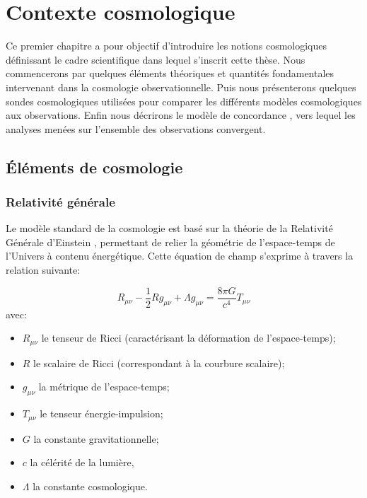 \documentclass[../main/main.tex]{subfiles}
\begin{document}
\chapter{Contexte cosmologique}\label{cp:cosmo}

\minitoc
\vspace{2cm}
Ce premier chapitre a pour objectif d'introduire les notions
cosmologiques définissant le cadre scientifique dans lequel s'inscrit
cette thèse. Nous commencerons par quelques éléments
théoriques et quantités fondamentales intervenant dans la cosmologie observationnelle. Puis nous
présenterons quelques sondes cosmologiques utilisées pour comparer les
différents modèles
cosmologiques aux observations. Enfin nous décrirons le modèle de
concordance \lcdm, vers lequel les analyses menées sur l'ensemble des
observations convergent.
\newpage
\section{\'Eléments de cosmologie}\label{sec:11}

\subsection{Relativité générale}

Le modèle standard de la cosmologie est basé sur la théorie de la
Relativité Générale d'Einstein
\citep{Einstein1915c,Einstein1915a,Einstein1915b}, permettant de relier la géométrie
de l'espace-temps de l'Univers à contenu énergétique. Cette équation de champ s'exprime à travers la relation suivante:

\begin{equation}
  \label{eq:generalrelativity}
  R_{\mu\nu}-\frac{1}{2}Rg_{\mu\nu}+\Lambda g_{\mu\nu}=\frac{8\pi G}{c^{4}}T_{\mu\nu}
\end{equation}
avec:
\begin{itemize}[noitemsep, label=$\diamondsuit$]
\item $R_{\mu\nu}$ le tenseur de Ricci (caractérisant la déformation
  de l'espace-temps);
\item $R$ le scalaire de Ricci (correspondant à la courbure
  scalaire);
\item $g_{\mu\nu}$ la métrique de l'espace-temps;
\item $T_{\mu\nu}$ le tenseur énergie-impulsion;
\item $G$ la constante gravitationnelle;
\item $c$ la célérité de la lumière,
\item $\Lambda$ la constante cosmologique.
\end{itemize}
\end{document}
